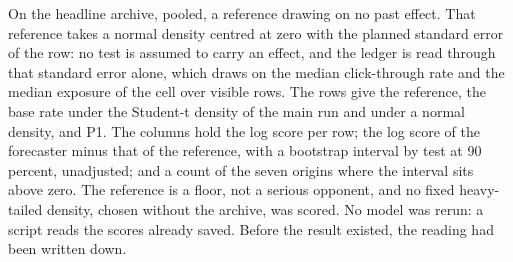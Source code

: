\begin{table}[tp]\centering\scriptsize
\caption{On the headline archive, pooled, a reference drawing on no past effect. That reference takes a normal density centred at zero with the planned standard error of the row: no test is assumed to carry an effect, and the ledger is read through that standard error alone, which draws on the median click-through rate and the median exposure of the cell over visible rows. The rows give the reference, the base rate under the Student-t density of the main run and under a normal density, and P1. The columns hold the log score per row; the log score of the forecaster minus that of the reference, with a bootstrap interval by test at 90 percent, unadjusted; and a count of the seven origins where the interval sits above zero. The reference is a floor, not a serious opponent, and no fixed heavy-tailed density, chosen without the archive, was scored. No model was rerun: a script reads the scores already saved. Before the result existed, the reading had been written down.}
\label{tab:fmt-no-history}
\resizebox{\columnwidth}{!}{%
}
\end{table}

\clearpage


